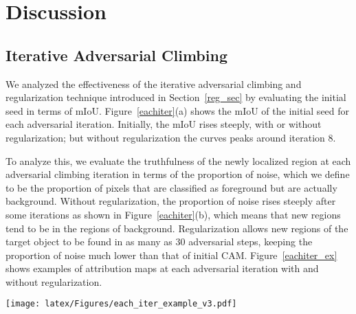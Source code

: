 \documentclass[final]{cvpr}
\begin{document}
\section{Discussion}



\subsection{Iterative Adversarial Climbing}\label{iterative}
We analyzed the effectiveness of the iterative adversarial climbing and regularization technique introduced in Section~\ref{reg_sec} by evaluating the initial seed in terms of mIoU. Figure~\ref{eachiter}(a) shows the mIoU of the initial seed for each adversarial iteration. Initially, the mIoU rises steeply, with or without regularization; but without regularization the curves peaks around iteration 8.

To analyze this, we evaluate the truthfulness of the newly localized region at each adversarial climbing iteration in terms of the proportion of noise, which we define to be the proportion of pixels that are classified as foreground but are actually background. Without regularization, the proportion of noise rises steeply after some iterations as shown in Figure~\ref{eachiter}(b), which means that new regions tend to be in the regions of background.
Regularization allows new regions of the target object to be found in as many as 30 adversarial steps, keeping the proportion of noise much lower than that of initial CAM.
Figure~\ref{eachiter_ex} shows examples of attribution maps at each adversarial iteration with and without regularization.



\begin{figure*}[t]
\centering
\vspace{-0.2em}
\texttt{[image: latex/Figures/each\_iter\_example\_v3.pdf]}
\vspace{-2em}
\caption{\label{eachiter_ex} Examples of initial CAMs (the blue boxes) and successive localization maps obtained from images manipulated by iterative adversarial climbing, with the regularization procedure (\textit{top}) and without (\textit{bottom}).}
\vspace{-1.em}
\end{figure*}
 
\end{document}
